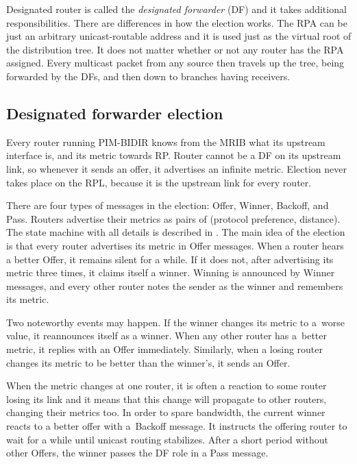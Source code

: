 Designated router is called the \emph{designated forwarder} (DF) and it takes additional
responsibilities. There are differences in how the election works. The RPA can be
just an arbitrary unicast-routable address and it is used just as the virtual root of the
distribution tree. It does not matter whether or not any router has the RPA
assigned. Every multicast packet from any source then travels up the tree,
being forwarded by the DFs, and then down to branches having receivers.

\subsection{Designated forwarder election}

Every router running PIM-BIDIR knows from the MRIB what its upstream interface is,
and its metric towards RP. Router cannot be a DF on its upstream link, so
whenever it sends an offer, it advertises an infinite metric. Election never takes place
on the RPL, because it is the upstream link for every router.

There are four types of messages in the election: Offer, Winner, Backoff, and
Pass. Routers advertise their metrics as pairs of (protocol preference, distance).
The state machine with all details is described in . The main idea of the
election is that every router advertises its metric in Offer messages. When
a router hears a better Offer, it remains silent for a while. If it does not, after
advertising its metric three times, it claims itself a winner. Winning is
announced by Winner messages, and every other router notes the sender as the
winner and remembers its metric.

Two noteworthy events may happen. If the winner changes its metric to a~worse value,
it reannounces itself as a winner. When any other router has a~better metric,
it replies with an Offer immediately. Similarly, when a losing router changes its
metric to be better than the winner's, it sends an Offer.

When the metric changes at one router, it is often a reaction to some router losing its
link and it means that this change will propagate to other routers, changing their
metrics too. In order to spare bandwidth, the current winner reacts to a better offer
with a~Backoff message. It instructs the offering router to wait for a while until
unicast routing stabilizes. After a short period without other Offers, the winner
passes the DF role in a Pass message.

